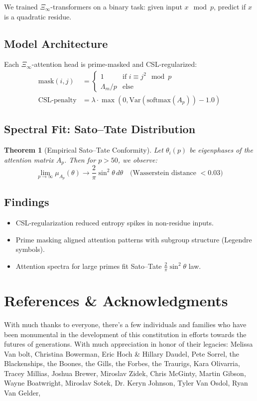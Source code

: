 \documentclass[12]{amsart}
\theoremstyle{plain}
\newtheorem{theorem}{Theorem}[section]
\begin{document}
We trained $\Xi_\infty$-transformers on a binary task: given input $x \mod p$, predict if $x$ is a quadratic residue. 

\subsection{Model Architecture}

Each $\Xi_\infty$-attention head is prime-masked and CSL-regularized:
\begin{align*}
\text{mask}(i, j) &= \begin{cases}
1 & \text{if } i \equiv j^2 \mod p \\
\Lambda_m / p & \text{else}
\end{cases} \\
\text{CSL-penalty} &= \lambda \cdot \max(0, \mathrm{Var}(\text{softmax}(A_p)) - 1.0)
\end{align*}

\subsection{Spectral Fit: Sato–Tate Distribution}

\begin{theorem}[Empirical Sato–Tate Conformity]
Let $\theta_i(p)$ be eigenphases of the attention matrix $A_p$. Then for $p > 50$, we observe:
\[
\lim_{p \to \infty} \mu_{A_p}(\theta) \to \frac{2}{\pi}\sin^2\theta \, d\theta \quad \text{(Wasserstein distance } < 0.03)
\]
\end{theorem}

\subsection{Findings}

\begin{itemize}
  \item CSL-regularization reduced entropy spikes in non-residue inputs.
  \item Prime masking aligned attention patterns with subgroup structure (Legendre symbols).
  \item Attention spectra for large primes fit Sato–Tate $\frac{2}{\pi}\sin^2\theta$ law.
\end{itemize}


\section{References \& Acknowledgments}

With much thanks to everyone, there's a few individuals and families who have been monumental in the development of this constitution in efforts towards the futures of generations. With much appreciation in honor of their legacies: Melissa Van bolt, Christina Bowerman, Eric Hoch \& Hillary Daudel, Pete Sorrel, the Blackenships, the Boones, the Gills, the Forbes, the Traurigs, Kara Olivarria, Tracey Millias, Joshua Brewer, Miroslav Zidek, Chris McGinty, Martin Gibson, Wayne Boatwright, Miroslav Sotek, Dr. Keryn Johnson, Tyler Van Osdol, Ryan Van Gelder, 
\nocite{*}


\clearpage
\end{document}
